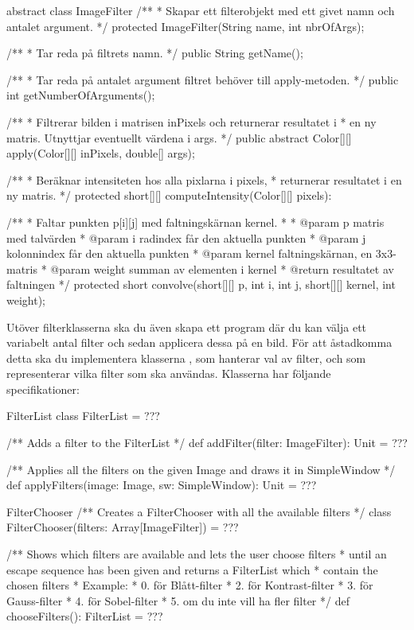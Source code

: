 \begin{JavaSpec}{abstract class ImageFilter}
/**
 * Skapar ett filterobjekt med ett givet namn och antalet argument.
 */
protected ImageFilter(String name, int nbrOfArgs);

/**
 * Tar reda på filtrets namn.
 */
public String getName();

/**
  * Tar reda på antalet argument filtret behöver till apply-metoden.
  */
public int getNumberOfArguments();

/**
 * Filtrerar bilden i matrisen inPixels och returnerar resultatet i
 * en ny matris. Utnyttjar eventuellt värdena i args.
 */
public abstract Color[][] apply(Color[][] inPixels, double[] args);


/**
 * Beräknar intensiteten hos alla pixlarna i pixels,
 * returnerar resultatet i en ny matris.
 */
protected short[][] computeIntensity(Color[][] pixels):

/**
 * Faltar punkten p[i][j] med faltningskärnan kernel.
 *
 * @param p 		matris med talvärden
 * @param i 		radindex får den aktuella punkten
 * @param j 		kolonnindex får den aktuella punkten
 * @param kernel	faltningskärnan, en 3x3-matris
 * @param weight	summan av elementen i kernel
 * @return 		resultatet av faltningen
 */
protected short convolve(short[][] p, int i, int j,
			short[][] kernel, int weight);
\end{JavaSpec}

Utöver filterklasserna ska du även skapa ett program där du kan välja ett variabelt antal filter och sedan applicera dessa på en bild. För att åstadkomma detta ska du implementera klasserna , som hanterar val av filter, och  som representerar vilka filter som ska användas. Klasserna har följande specifikationer:

\begin{ScalaSpec}{FilterList}
class FilterList = ???

/** Adds a filter to the FilterList */
def addFilter(filter: ImageFilter): Unit = ???

/** Applies all the filters on the given Image and draws it in SimpleWindow */
def applyFilters(image: Image, sw: SimpleWindow): Unit = ???
\end{ScalaSpec}

\begin{ScalaSpec}{FilterChooser}
/** Creates a FilterChooser with all the available filters */
class FilterChooser(filters: Array[ImageFilter]) = ???

/** Shows which filters are available and lets the user choose filters
*   until an escape sequence has been given and returns a FilterList which
*   contain the chosen filters
*   Example:
*   0. för Blått-filter
*   2. för Kontrast-filter
*   3. för Gauss-filter
*   4. för Sobel-filter
*   5. om du inte vill ha fler filter
*/
def chooseFilters(): FilterList = ???
\end{ScalaSpec}

